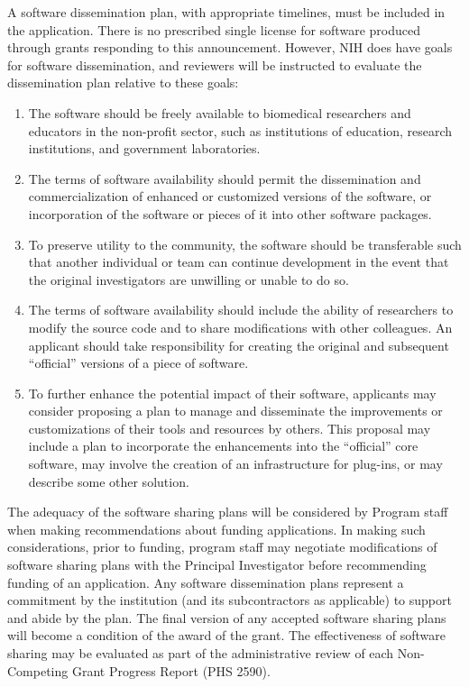\documentclass[11pt]{article}
\newcommand{\instructions}[1]{}
\renewcommand{\instructions}[1]{{\scriptsize \sc #1}}
\begin{document}
\instructions{A software dissemination plan, with appropriate
  timelines, must be included in the application. There is no
  prescribed single license for software produced through grants
  responding to this announcement.  However, NIH does have goals for
  software dissemination, and reviewers will be instructed to evaluate
  the dissemination plan relative to these goals:
\begin{enumerate}
\item The software should be freely available to biomedical
  researchers and educators in the non-profit sector, such as
  institutions of education, research institutions, and government
  laboratories.
\item The terms of software availability should permit the
  dissemination and commercialization of enhanced or customized
  versions of the software, or incorporation of the software or pieces
  of it into other software packages.
\item To preserve utility to the community, the software should be
  transferable such that another individual or team can continue
  development in the event that the original investigators are
  unwilling or unable to do so.
\item The terms of software availability should include the ability of
  researchers to modify the source code and to share modifications
  with other colleagues.  An applicant should take responsibility for
  creating the original and subsequent ``official'' versions of a
  piece of software.
\item To further enhance the potential impact of their software,
  applicants may consider proposing a plan to manage and disseminate
  the improvements or customizations of their tools and resources by
  others.  This proposal may include a plan to incorporate the
  enhancements into the ``official'' core software, may involve the
  creation of an infrastructure for plug-ins, or may describe some
  other solution.
\end{enumerate}
The adequacy of the software sharing plans will be considered by
Program staff when making recommendations about funding applications.
In making such considerations, prior to funding, program staff may
negotiate modifications of software sharing plans with the Principal
Investigator before recommending funding of an application. Any
software dissemination plans represent a commitment by the institution
(and its subcontractors as applicable) to support and abide by the
plan.  The final version of any accepted software sharing plans will
become a condition of the award of the grant. The effectiveness of
software sharing may be evaluated as part of the administrative review
of each Non-Competing Grant Progress Report (PHS 2590).}
\end{document}
